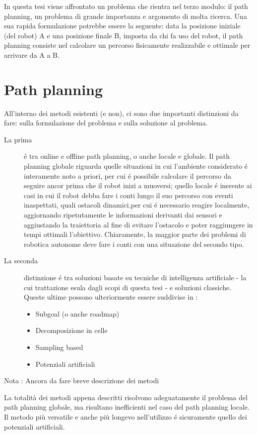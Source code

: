 \documentclass[14pt,twoside,a4paper]{extarticle}
\begin{document}
In questa tesi viene affrontato un problema che rientra nel terzo modulo: il path planning, un problema di grande importanza e argomento di molta ricerca. Una sua rapida formulazione potrebbe essere la seguente: data la posizione iniziale (del robot) A e una posizione finale B, imposta da chi fa uso del robot, il path planning consiste nel calcolare un percorso fisicamente realizzabile e ottimale per arrivare da A a B.  


\section{Path planning}

All'interno dei metodi esistenti (e non), ci sono due importanti distinzioni da fare: sulla formulazione del problema e sulla soluzione al problema.
\begin{description}
\item[La prima] é tra online e offline path planning, o anche locale e globale. Il path planning globale riguarda quelle situazioni in cui l'ambiente considerato é interamente noto a priori, per cui é possibile calcolare il percorso da seguire ancor prima che il robot inizi a muoversi; quello locale é inerente ai casi in cui il robot debba fare i conti lungo il suo percorso con eventi inaspettati, quali ostacoli dinamici,per cui é necessario reagire localmente, aggiornando ripetutamente le informazioni derivanti dai sensori e aggiustando la traiettoria al fine di evitare l'ostacolo e poter raggiungere in tempi ottimali l'obiettivo. Chiaramente, la maggior parte dei problemi di robotica autonome deve fare i conti con una situazione del secondo tipo. 
\item[La seconda] distinzione é tra soluzioni basate su tecniche di intelligenza artificiale - la cui trattazione esula dagli scopi di questa tesi - e soluzioni classiche. Queste ultime possono ulteriormente essere suddivise in \cite{siciliano}:
\begin{itemize}
\item{Subgoal (o anche roadmap)}
\item{Decomposizione in celle}
\item{Sampling based}
\item{Potenziali artificiali}
\end{itemize}
\end{description}

Nota : Ancora da fare breve descrizione dei metodi

La totalità dei metodi appena descritti risolvono adeguatamente il problema del path planning globale\cite{dalfonso}, ma risultano inefficienti nel caso del path planning locale. Il metodo più versatile e anche più longevo nell'utilizzo é sicuramente quello dei potenziali artificiali.
\end{document}
